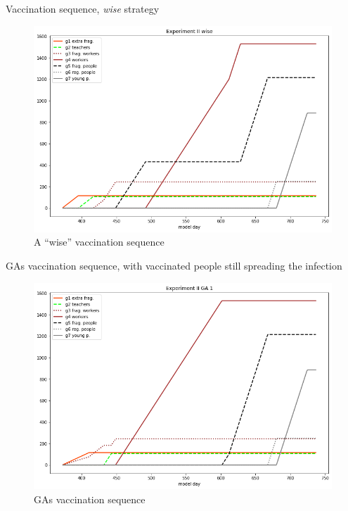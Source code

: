 \documentclass[8pt]{beamer}
\begin{document}
\begin{frame}{Vaccination sequence, \emph{wise} strategy}

\begin{figure}[H]
\center
\includegraphics[scale=0.4]{Experiment_II_wiseVaccinationSequence.png} %

\caption{A ``wise'' vaccination sequence} 
\label{Experiment_II_wiseVaccinationSequence}
\end{figure}




\end{frame}

\begin{frame}{GAs vaccination sequence, with vaccinated people still spreading the infection}


\begin{figure}[H]
\center
\includegraphics[scale=0.4]{Experiment_II_GA_1_VaccinationSequence.png} %

\caption{GAs vaccination sequence} 
\label{Experiment_II_GA1VaccinationSequence}
\end{figure}



\end{frame}
\end{document}

